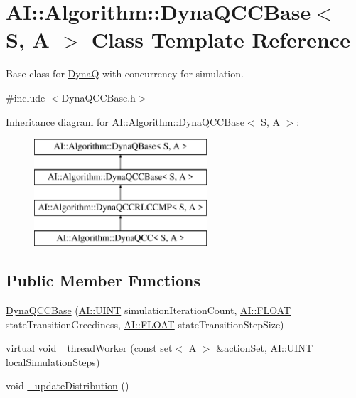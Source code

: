 \hypertarget{classAI_1_1Algorithm_1_1DynaQCCBase}{\section{A\-I\-:\-:Algorithm\-:\-:Dyna\-Q\-C\-C\-Base$<$ S, A $>$ Class Template Reference}
\label{classAI_1_1Algorithm_1_1DynaQCCBase}
}


Base class for \hyperlink{classAI_1_1Algorithm_1_1DynaQ}{Dyna\-Q} with concurrency for simulation.  




{\ttfamily \#include $<$Dyna\-Q\-C\-C\-Base.\-h$>$}

Inheritance diagram for A\-I\-:\-:Algorithm\-:\-:Dyna\-Q\-C\-C\-Base$<$ S, A $>$\-:\begin{figure}[H]
\begin{center}
\leavevmode
\includegraphics[height=4.000000cm]{classAI_1_1Algorithm_1_1DynaQCCBase}
\end{center}
\end{figure}
\subsection*{Public Member Functions}
\begin{DoxyCompactItemize}
\item 
\hyperlink{classAI_1_1Algorithm_1_1DynaQCCBase_acd1924d5f560d9a7298e442dfa33716a}{Dyna\-Q\-C\-C\-Base} (\hyperlink{namespaceAI_ab6e14dc1e659854858a87e511f1439ec}{A\-I\-::\-U\-I\-N\-T} simulation\-Iteration\-Count, \hyperlink{namespaceAI_a41b74884a20833db653dded3918e05c3}{A\-I\-::\-F\-L\-O\-A\-T} state\-Transition\-Greediness, \hyperlink{namespaceAI_a41b74884a20833db653dded3918e05c3}{A\-I\-::\-F\-L\-O\-A\-T} state\-Transition\-Step\-Size)
\item 
virtual void \hyperlink{classAI_1_1Algorithm_1_1DynaQCCBase_a56e5d7ee46d67400f9e2411e801f93d2}{\-\_\-thread\-Worker} (const set$<$ A $>$ \&action\-Set, \hyperlink{namespaceAI_ab6e14dc1e659854858a87e511f1439ec}{A\-I\-::\-U\-I\-N\-T} local\-Simulation\-Steps)
\item 
void \hyperlink{classAI_1_1Algorithm_1_1DynaQCCBase_aeff65821d73179f84390892d8a2b0d3c}{\-\_\-update\-Distribution} ()
\end{DoxyCompactItemize}

